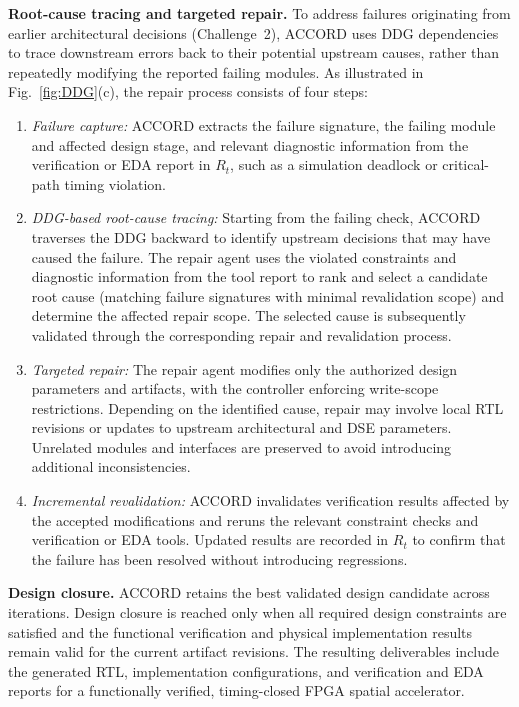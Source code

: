 \documentclass[9pt,conference]{IEEEtran}
\begin{document}
\textbf{Root-cause tracing and targeted repair.}
To address failures originating from earlier architectural decisions (Challenge~2), ACCORD uses DDG dependencies to trace downstream errors back to their potential upstream causes, rather than repeatedly modifying the reported failing modules. As illustrated in Fig.~\ref{fig:DDG}(c), the repair process consists of four steps:
\begin{enumerate}
\item \emph{Failure capture:} ACCORD extracts the failure signature, the failing module and affected design stage, and relevant diagnostic information from the verification or EDA report in $R_t$, such as a simulation deadlock or critical-path timing violation.
\item \emph{DDG-based root-cause tracing:}
Starting from the failing check, ACCORD traverses
the DDG backward to identify upstream decisions
that may have caused the failure. The repair agent
uses the violated constraints and diagnostic
information from the tool report to rank and select a
candidate root cause (matching failure signatures with minimal revalidation scope) and determine the affected
repair scope. The selected cause is subsequently
validated through the corresponding repair and
revalidation process.
\item \emph{Targeted repair:} The repair agent modifies only the authorized design parameters and artifacts, with the controller enforcing write-scope restrictions. Depending on the identified cause, repair may involve local RTL revisions or updates to upstream architectural and DSE parameters. Unrelated modules and interfaces are preserved to avoid introducing additional inconsistencies.
\item \emph{Incremental revalidation:} ACCORD invalidates verification results affected by the accepted modifications and reruns the relevant constraint checks and verification or EDA tools. Updated results are recorded in $R_t$ to confirm that the failure has been resolved without introducing regressions.
\end{enumerate}

\textbf{Design closure.}
ACCORD retains the best validated design candidate across iterations. Design closure is reached only when all required design constraints are satisfied and the functional verification and physical implementation results remain valid for the current artifact revisions. The resulting deliverables include the generated RTL, implementation configurations, and verification and EDA reports for a functionally verified, timing-closed FPGA spatial accelerator.
\end{document}
